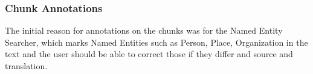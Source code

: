 %
%
%

\subsubsection{Chunk Annotations}

The initial reason for annotations on the chunks was for the Named Entity Searcher, which marks Named Entities such as Person, Place, Organization in the text and the user should be able to correct those if they differ and source and translation.

